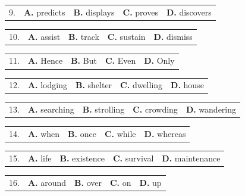 \documentclass[UTF8,11pt]{ctexart}
\begin{document}
\noindent\begin{tabularx}{\linewidth}{@{}lXXXX@{}}9. & \textbf{A.} predicts & \textbf{B.} displays & \textbf{C.} proves & \textbf{D.} discovers\\\end{tabularx}\par

\noindent\begin{tabularx}{\linewidth}{@{}lXXXX@{}}10. & \textbf{A.} assist & \textbf{B.} track & \textbf{C.} sustain & \textbf{D.} dismiss\\\end{tabularx}\par

\noindent\begin{tabularx}{\linewidth}{@{}lXXXX@{}}11. & \textbf{A.} Hence & \textbf{B.} But & \textbf{C.} Even & \textbf{D.} Only\\\end{tabularx}\par

\noindent\begin{tabularx}{\linewidth}{@{}lXXXX@{}}12. & \textbf{A.} lodging & \textbf{B.} shelter & \textbf{C.} dwelling & \textbf{D.} house\\\end{tabularx}\par

\noindent\begin{tabularx}{\linewidth}{@{}lXXXX@{}}13. & \textbf{A.} searching & \textbf{B.} strolling & \textbf{C.} crowding & \textbf{D.} wandering\\\end{tabularx}\par

\noindent\begin{tabularx}{\linewidth}{@{}lXXXX@{}}14. & \textbf{A.} when & \textbf{B.} once & \textbf{C.} while & \textbf{D.} whereas\\\end{tabularx}\par

\noindent\begin{tabularx}{\linewidth}{@{}lXXXX@{}}15. & \textbf{A.} life & \textbf{B.} existence & \textbf{C.} survival & \textbf{D.} maintenance\\\end{tabularx}\par

\noindent\begin{tabularx}{\linewidth}{@{}lXXXX@{}}16. & \textbf{A.} around & \textbf{B.} over & \textbf{C.} on & \textbf{D.} up\\\end{tabularx}\par
\end{document}
